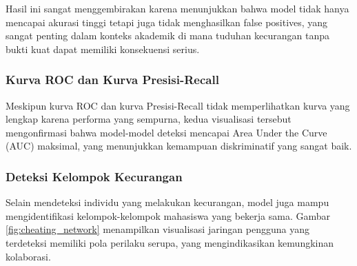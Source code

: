 Hasil ini sangat menggembirakan karena menunjukkan bahwa model tidak hanya mencapai akurasi tinggi tetapi juga tidak menghasilkan false positives, yang sangat penting dalam konteks akademik di mana tuduhan kecurangan tanpa bukti kuat dapat memiliki konsekuensi serius.

\subsubsection{Kurva ROC dan Kurva Presisi-Recall}




Meskipun kurva ROC dan kurva Presisi-Recall tidak memperlihatkan kurva yang lengkap karena performa yang sempurna, kedua visualisasi tersebut mengonfirmasi bahwa model-model deteksi mencapai Area Under the Curve (AUC) maksimal, yang menunjukkan kemampuan diskriminatif yang sangat baik.

\subsubsection{Deteksi Kelompok Kecurangan}

Selain mendeteksi individu yang melakukan kecurangan, model juga mampu mengidentifikasi kelompok-kelompok mahasiswa yang bekerja sama. Gambar \ref{fig:cheating_network} menampilkan visualisasi jaringan pengguna yang terdeteksi memiliki pola perilaku serupa, yang mengindikasikan kemungkinan kolaborasi.


